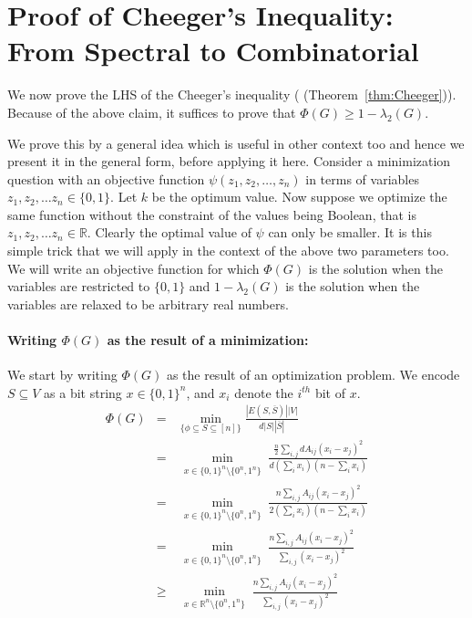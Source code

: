 \section{Proof of Cheeger's Inequality: From Spectral to Combinatorial}
We now prove the LHS of the Cheeger's inequality ( (Theorem~\ref{thm:Cheeger})). Because of the above claim, it suffices to prove that $\Phi(G) \ge 1-\lambda_2(G)$. 

 We prove this by a general idea which is useful in other context too and hence we present it in the general form, before applying it here. Consider a minimization question with an objective function $\psi(z_1, z_2, \ldots, z_n)$ in terms of variables $z_1, z_2, \ldots z_n \in \{0,1\}$. Let $k$ be the optimum value. Now suppose we optimize the same function without the constraint of the values being Boolean, that is $z_1, z_2, \ldots z_n \in \mathbb{R}$. Clearly the optimal value of $\psi$ can only be smaller. It is this simple trick that we will apply in the context of the above two parameters too. We will write an objective function for which $\Phi(G)$ is the solution when the variables are restricted to $\{0,1\}$ and $1-\lambda_2(G)$ is the solution when the variables are relaxed to be arbitrary real numbers.

\paragraph{\textbf{Writing $\Phi(G)$ as the result of a minimization:}} We start by writing $\Phi(G)$ as the result of an optimization problem. We encode $S \subseteq V$ as a bit string $x \in\{0,1\}^n$, and $x_i$ denote the $i^{th}$ bit of $x$.
\begin{eqnarray}
\Phi(G) & = & \min_{\{\phi \subseteq S \subseteq [n]\}} \frac{|E(S,\overline{S})||V|}{d|S||\overline{S}|}\\
& = & \min_{\substack{x \in \{0,1\}^n\setminus \{0^n,1^n\}}} \frac{\frac{n}{2}\sum_{i,j}dA_{ij}(x_i-x_j)^2}{d(\sum_{i} x_i)(n-\sum_i x_i)}\\
& = & \min_{\substack{x \in \{0,1\}^n\setminus \{0^n,1^n\}}} \frac{n\sum_{i,j}A_{ij}(x_i-x_j)^2}{2(\sum_{i} x_i)(n-\sum_i x_i)} \\
& = & \min_{\substack{x \in \{0,1\}^n\setminus \{0^n,1^n\}}} \frac{n\sum_{i,j}A_{ij}(x_i-x_j)^2}{\sum_{i,j}(x_i-x_j)^2} \\
& \ge & \min_{\substack{x \in \mathbb{R}^n\setminus \{0^n,1^n\}}} \frac{n\sum_{i,j}A_{ij}(x_i-x_j)^2}{\sum_{i,j}(x_i-x_j)^2} 
\end{eqnarray}

